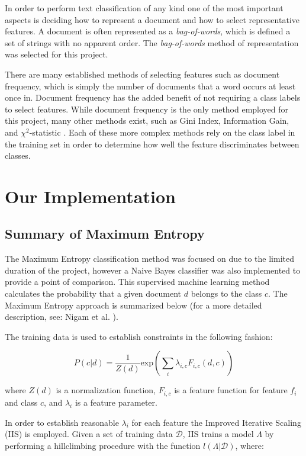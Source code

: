 \documentclass[final,3p,12pt]{elsarticle}
\begin{document}
In order to perform text classification of any kind one of the most important
aspects is deciding how to represent a document and how to select
representative features. A document is often represented as a
\textit{bag-of-words}, which is defined a set of strings with no apparent
order. The \textit{bag-of-words} method of representation was selected for this
project.

There are many established methods of selecting features such as document
frequency, which is simply the number of documents that a word occurs at least
once in. Document frequency has the added benefit of not requiring a class
labels to select features. While document frequency is the only method employed
for this project, many other methods exist, such as Gini Index, Information Gain,
and $\chi^{2}$-statistic \cite{Aggarwal2012}. Each of these more complex
methods rely on the class label in the training set in order to determine how
well the feature discriminates between classes.

\section{Our Implementation}
\label{section:implementation}

\subsection{Summary of Maximum Entropy}
\label{ssection:summaryofmaxent}

The Maximum Entropy classification method was focused on due to the limited
duration of the project, however a Naive Bayes classifier was also implemented
to provide a point of comparison. This supervised machine learning method
calculates the probability that a given document $d$ belongs to the class $c$.
The Maximum Entropy approach is summarized below (for a more detailed
description, see: Nigam et al. \cite{Nigam1999}).

The training data is used to establish constraints in the following fashion:

\begin{equation}
    P(c | d) = \frac{1}{Z(d)} \mathrm{exp}(\sum\limits_{i} \lambda _{i,c} F_{i,c}(d,c) )
\end{equation}

where $Z(d)$ is a normalization function, $F_{i,c}$ is a feature function for
feature $f_{i}$ and class $c$, and $\lambda_{i}$ is a feature parameter.

In order to establish reasonable $\lambda_{i}$ for each feature the Improved
Iterative Scaling (IIS) is employed. Given a set of training data
$\mathcal{D}$, IIS trains a model $\Lambda$ by performing a hillclimbing
procedure with the function $l(\Lambda|\mathcal{D})$, where:
\end{document}
